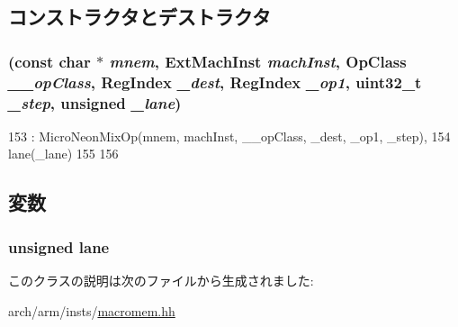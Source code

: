 \subsection{コンストラクタとデストラクタ}
\hypertarget{classArmISA_1_1MicroNeonMixLaneOp_af3cc50e0446af48efb448a4cf391165c}{
\subsubsection[{MicroNeonMixLaneOp}]{ (const char $\ast$ {\em mnem}, \/  {\bf ExtMachInst} {\em machInst}, \/  OpClass {\em \_\-\_\-opClass}, \/  {\bf RegIndex} {\em \_\-dest}, \/  {\bf RegIndex} {\em \_\-op1}, \/  {\bf uint32\_\-t} {\em \_\-step}, \/  unsigned {\em \_\-lane})}}
\label{classArmISA_1_1MicroNeonMixLaneOp_af3cc50e0446af48efb448a4cf391165c}



\begin{DoxyCode}
153             : MicroNeonMixOp(mnem, machInst, __opClass, _dest, _op1, _step),
154               lane(_lane)
155     {
156     }
\end{DoxyCode}


\subsection{変数}
\hypertarget{classArmISA_1_1MicroNeonMixLaneOp_a11dafb05e242b40250edce6bc9cfd29f}{
\subsubsection[{lane}]{\setlength{\rightskip}{0pt plus 5cm}unsigned {\bf lane}}}
\label{classArmISA_1_1MicroNeonMixLaneOp_a11dafb05e242b40250edce6bc9cfd29f}


このクラスの説明は次のファイルから生成されました:\begin{DoxyCompactItemize}
\item 
arch/arm/insts/\hyperlink{macromem_8hh}{macromem.hh}\end{DoxyCompactItemize}
